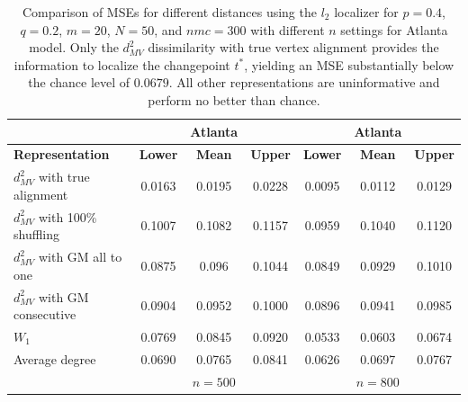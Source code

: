 \documentclass[12pt]{article}
\theoremstyle{definition}
\begin{document}
\begin{table}[htbp]
\centering
\centering
\begin{tabular}{lccc||ccc}
&&\textbf{Atlanta}&&&\textbf{Atlanta}&\\
\hline
\textbf{Representation} & \textbf{Lower} & \textbf{Mean} & \textbf{Upper} &\textbf{Lower} & \textbf{Mean} & \textbf{Upper} \\
\hline
$d^2_{MV}$ with true alignment  & 0.0163 & 0.0195 & 0.0228 &0.0095 & 0.0112 & 0.0129 \\
$d^2_{MV}$ with 100\% shuffling         & 0.1007 & 0.1082 & 0.1157 &0.0959 & 0.1040 & 0.1120 \\
$d^2_{MV}$ with GM all to one        & 0.0875 & 0.096 & 0.1044 &0.0849 & 0.0929 & 0.1010 \\
$d^2_{MV}$ with GM consecutive       & 0.0904 & 0.0952 & 0.1000 &0.0896 & 0.0941 & 0.0985 \\
$W_1$                                 & 0.0769 & 0.0845 & 0.0920 &0.0533 & 0.0603 & 0.0674 \\
Average degree                          &  0.0690 & 0.0765 & 0.0841 &0.0626 & 0.0697 & 0.0767 \\
\hline
&&$n=500$&&&$n=800$&
\end{tabular}
\caption{Comparison of MSEs for different distances using the $l_2$ localizer for $p = 0.4$, $q = 0.2$, $m = 20$, $N = 50$, and $nmc = 300$ with different $n$ settings for Atlanta model. 
Only the $d^2_{MV}$ dissimilarity with true vertex alignment provides the information to localize the changepoint $t^*$, yielding an MSE substantially below the chance level of $0.0679$. 
All other representations are uninformative and perform no better than chance.}
\label{table:A}
\end{table}
\end{document}
